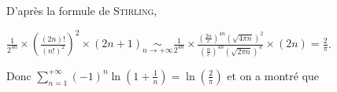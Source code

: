 {{D'après la formule de \textsc{Stirling},   

\begin{center}
$\frac{1}{2^{4n}}\times\left(\frac{(2n)!}{(n!)^2}\right)^2\times(2n+1)\underset{n\rightarrow+\infty}{\sim}\frac{1}{2^{4n}}\times\frac{\left(\frac{2n}{e}\right)^{4n}(\sqrt{4\pi n})^2}{\left(\frac{n}{e}\right)^{4n}(\sqrt{2\pi n})^4}\times(2n)=\frac{2}{\pi}$.
\end{center}

Donc $\sum_{n=1}^{+\infty}(-1)^n\ln\left(1+\frac{1}{n}\right)=\ln\left(\frac{2}{\pi}\right)$ et on a montré que

\begin{center}
\end{center}
}
}
